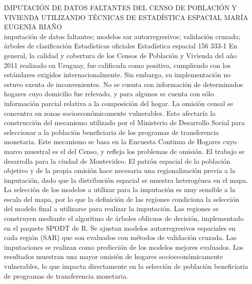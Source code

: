 \A
{IMPUTACIÓN DE DATOS FALTANTES DEL CENSO DE POBLACIÓN Y VIVIENDA UTILIZANDO TÉCNICAS DE ESTADÍSTICA ESPACIAL}
{MARÍA EUGENIA RIAÑO}
{
\\
}
{imputación de datos faltantes; modelos sar autorregresivos; validación cruzada; árboles de clasificación} 
 {Estadísticas oficiales} 
 {Estadística espacial} 
 {156} 
 {333-1}
{En general, la calidad y cobertura de los Censos de Población y Vivienda del año 2011 realizado en Uruguay, fue calificada como positiva, cumpliendo con los estándares exigidos internacionalmente. Sin embargo, su implementación no estuvo exenta de inconvenientes. No se cuenta con información de determinados hogares cuyo domicilio fue relevado, y para algunos se cuenta con sólo información parcial relativa a la composición del hogar. La omisión censal se concentra en zonas socioeconómicamente vulnerables. Esto afectaría la construcción del mecanismo utilizado por el Ministerio de Desarrollo Social para seleccionar a la población beneficiaria de los programas de transferencia monetaria. Este mecanismo se basa en la Encuesta Continua de Hogares cuyo marco muestral es el del Censo, y refleja los problemas de omisión. El trabajo se desarrolla para la ciudad de Montevideo. El patrón espacial de la población objetivo y de la propia omisión hace necesaria una regionalización previa a la imputación, dado que la distribución espacial se muestra heterogénea en el mapa. La selección de los modelos a utilizar para la imputación es muy sensible a la escala del mapa, por lo que la definición de las regiones condiciona la selección del modelo final a utilizarse para realizar la imputación. Las regiones se construyen mediante el algoritmo de árboles oblicuos de decisión, implementado en el paquete SPODT de R. Se ajustan modelos autorregresivos espaciales en cada región (SAR) que son evaluados con métodos de validación cruzada. Las imputaciones se realizan como predicción de los modelos mejores evaluados. Los resultados muestran una mayor omisión de hogares socioeconómicamente vulnerables, lo que impacta directamente en la selección de población beneficiaria de programas de transferencia monetaria. }
